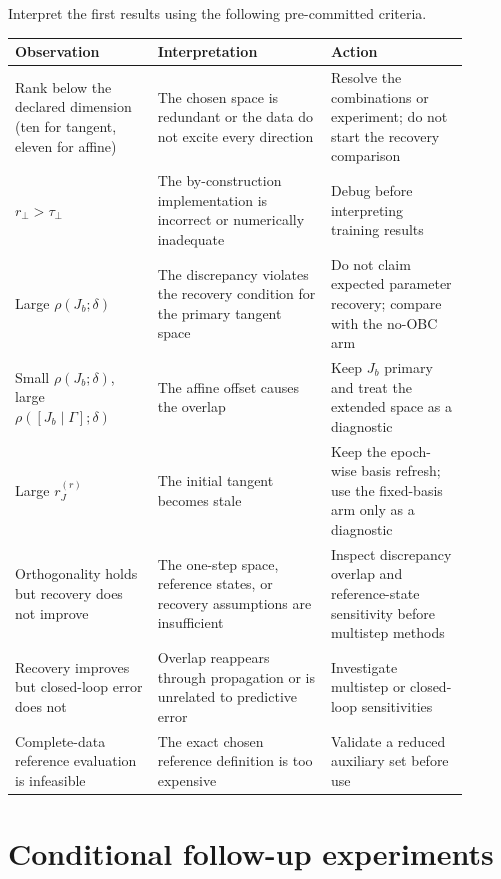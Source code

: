 \documentclass[11pt,a4paper]{article}
\begin{document}
Interpret the first results using the following pre-committed criteria.
\begin{center}
\small
\begin{tabular}{L{0.29\linewidth}L{0.34\linewidth}L{0.27\linewidth}}
\toprule
Observation & Interpretation & Action \\
\midrule
Rank below the declared dimension (ten for tangent, eleven for affine) & The chosen space is redundant or the data do not
excite every direction & Resolve the combinations or experiment; do not start
the recovery comparison \\
\(r_\perp>\tau_\perp\) & The by-construction implementation is incorrect or
numerically inadequate & Debug before interpreting training results \\
Large \(\rho(J_b;\delta)\) & The discrepancy violates the recovery condition
for the primary tangent space & Do not claim expected parameter recovery;
compare with the no-OBC arm \\
Small \(\rho(J_b;\delta)\), large
\(\rho([J_b\mid\Gamma];\delta)\) & The affine offset causes the overlap & Keep
\(J_b\) primary and treat the extended space as a diagnostic \\
Large \(r_J^{(r)}\) & The initial tangent becomes stale & Keep the epoch-wise
basis refresh; use the fixed-basis arm only as a diagnostic \\
Orthogonality holds but recovery does not improve & The one-step space,
reference states, or recovery assumptions are insufficient & Inspect
discrepancy overlap and reference-state sensitivity before multistep methods \\
Recovery improves but closed-loop error does not & Overlap reappears through
propagation or is unrelated to predictive error & Investigate multistep or
closed-loop sensitivities \\
Complete-data reference evaluation is infeasible & The exact chosen reference
definition is too expensive & Validate a reduced auxiliary set before use \\
\bottomrule
\end{tabular}
\end{center}

\section{Conditional follow-up experiments}
\end{document}
